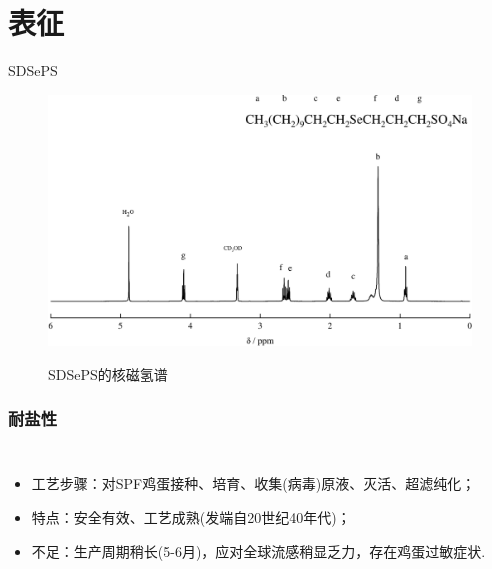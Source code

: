 \documentclass[10pt,aspectratio=43,mathserif]{beamer}
\begin{document}
\section{表征}
\begin{frame}{SDSePS }
    \begin{figure}[htbp]
        \centering
        \includegraphics[width=.85\textwidth]{figure/SDSePS-nmr.pdf}\\
        \caption{SDSePS的核磁氢谱}\label{fig:SDSePS-nmr}
    \end{figure}
\end{frame}

\begin{frame}
\frametitle{耐盐性}
\begin{columns}[c]
\begin{itemize}
    \item 工艺步骤：对SPF鸡蛋接种、培育、收集(病毒)原液、灭活、超滤纯化；
    \item 特点：安全有效、工艺成熟(发端自20世纪40年代)；
    \item 不足：生产周期稍长(5-6月)，应对全球流感稍显乏力，存在鸡蛋过敏症状.
\end{itemize}
\end{columns}
\end{frame}
\end{document}
